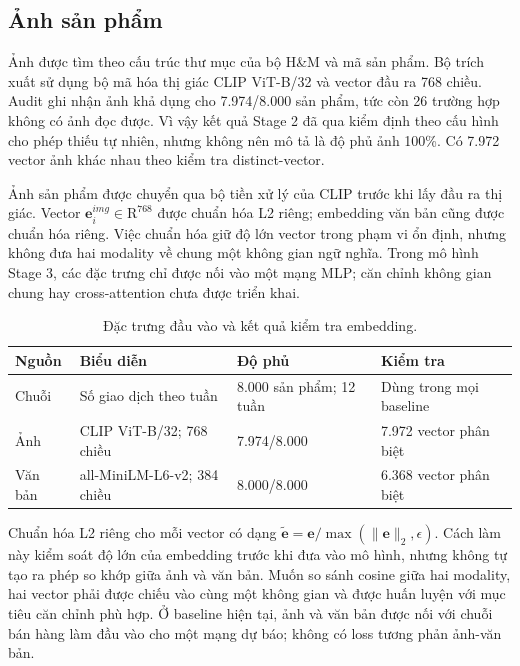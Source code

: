 \documentclass[12pt,a4paper,oneside]{article}
\begin{document}
\subsection{Ảnh sản phẩm}
Ảnh được tìm theo cấu trúc thư mục của bộ H\&M và mã sản phẩm. Bộ trích xuất sử dụng bộ mã hóa thị giác CLIP ViT-B/32 và vector đầu ra 768 chiều. Audit ghi nhận ảnh khả dụng cho 7.974/8.000 sản phẩm, tức còn 26 trường hợp không có ảnh đọc được. Vì vậy kết quả Stage 2 đã qua kiểm định theo cấu hình cho phép thiếu tự nhiên, nhưng không nên mô tả là độ phủ ảnh 100\%. Có 7.972 vector ảnh khác nhau theo kiểm tra distinct-vector.

Ảnh sản phẩm được chuyển qua bộ tiền xử lý của CLIP trước khi lấy đầu ra thị giác. Vector $\mathbf{e}^{img}_i\in\mathrm{R}^{768}$ được chuẩn hóa L2 riêng; embedding văn bản cũng được chuẩn hóa riêng. Việc chuẩn hóa giữ độ lớn vector trong phạm vi ổn định, nhưng không đưa hai modality về chung một không gian ngữ nghĩa. Trong mô hình Stage 3, các đặc trưng chỉ được nối vào một mạng MLP; căn chỉnh không gian chung hay cross-attention chưa được triển khai.

\begin{table}[!htbp]
\centering
\caption{Đặc trưng đầu vào và kết quả kiểm tra embedding.}
\label{tab:embedding}
\begin{tabular}{p{}p{}p{}p{}}
\toprule
Nguồn & Biểu diễn & Độ phủ & Kiểm tra \\
\midrule
Chuỗi & Số giao dịch theo tuần & 8.000 sản phẩm; 12 tuần & Dùng trong mọi baseline \\
Ảnh & CLIP ViT-B/32; 768 chiều & 7.974/8.000 & 7.972 vector phân biệt \\
Văn bản & all-MiniLM-L6-v2; 384 chiều & 8.000/8.000 & 6.368 vector phân biệt \\
\bottomrule
\end{tabular}
\end{table}

Chuẩn hóa L2 riêng cho mỗi vector có dạng $\tilde{\mathbf{e}}=\mathbf{e}/\max(\|\mathbf{e}\|_2,\epsilon)$. Cách làm này kiểm soát độ lớn của embedding trước khi đưa vào mô hình, nhưng không tự tạo ra phép so khớp giữa ảnh và văn bản. Muốn so sánh cosine giữa hai modality, hai vector phải được chiếu vào cùng một không gian và được huấn luyện với mục tiêu căn chỉnh phù hợp. Ở baseline hiện tại, ảnh và văn bản được nối với chuỗi bán hàng làm đầu vào cho một mạng dự báo; không có loss tương phản ảnh-văn bản.
\end{document}
